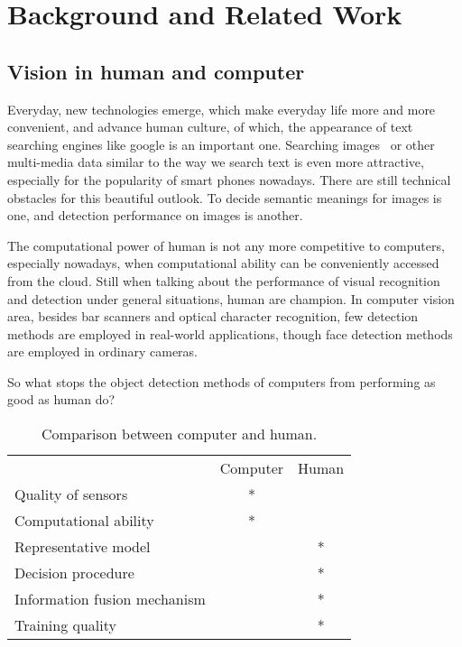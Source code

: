 \chapter{Background and Related Work}

\section{Vision in human and computer}

Everyday, new technologies emerge, which make everyday life more and more convenient, and advance human culture, of which, the appearance of text searching engines like google is  an important one. Searching images~\cite{bisearch} or other multi-media data similar to the way we search text is even more attractive, especially for the popularity of smart phones nowadays. There are still technical obstacles for this beautiful outlook. To decide semantic meanings for images is one, and detection performance on images is another.

  

The computational power of human is not any more competitive to computers, especially nowadays, when computational ability can be conveniently accessed from the cloud.
Still when talking about the performance of visual recognition and detection under general situations, human are champion. In computer vision area, besides bar scanners and optical character recognition, few detection methods are employed in real-world applications, though face detection methods are employed in ordinary cameras.

So what stops the object detection methods of computers from performing as good as human do?

\begin{table}[h]
\centering
\begin{tabular}{lcc}
     \hline
     \hline
                               &	Computer & Human \\
    Quality of sensors         &	* &   \\
    Computational ability      &	* &	  \\
    Representative model       &	  & * \\
    Decision procedure         &      & *	  \\
    Information fusion mechanism & & *           \\
    Training quality           &      & *	   \\
   \hline
\end{tabular}
\caption[Power comparison between computer and human]{Comparison between computer and human.}\label{c2tb:tb1}
\end{table}

